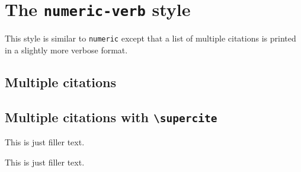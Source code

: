 \documentclass[a4paper]{article}
\newcommand{\cmd}[1]{\texttt{\textbackslash #1}}
\begin{document}
\section*{The \texttt{numeric-verb} style}

This style is similar to \texttt{numeric} except that a list of
multiple citations is printed in a slightly more verbose format.

\subsection*{Multiple citations}

\cite{hammond,massa,augustine,cotton,set,murray,bertram,stdmodel}

\cite{yoon,salam}

\subsection*{Multiple citations with \cmd{supercite}}

This is just filler text.\supercite{hammond,massa,augustine,cotton,set,murray,bertram,stdmodel}

This is just filler text.\supercite{yoon,salam}

\clearpage
\printbibliography
\end{document}
